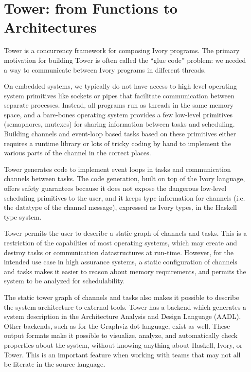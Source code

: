 \section{Tower: from Functions to Architectures}
\label{sec:tower}

Tower is a concurrency framework for composing Ivory programs. The primary
motivation for building Tower is often called the ``glue code'' problem: we
needed a way to communicate between Ivory programs in different threads.

On embedded systems, we typically do not have access to high level operating
system primitives like sockets or pipes that facilitate communication between
separate processes. Instead, all programs run as threads in the same memory
space, and a bare-bones operating system provides a few low-level primitives
(semaphores, mutexes) for sharing information between tasks and scheduling.
Building channels and event-loop based tasks based on these primitives either
requires a runtime library or lots of tricky coding by hand to implement the
various parts of the channel in the correct places.

Tower generates code to implement event loops in tasks and communication
channels between tasks. The code generation, built on top of the Ivory language,
offers safety guarantees because it does not expose the dangerous low-level
scheduling primitives to the user, and it keeps type information for channels
(i.e. the datatype of the channel message), expressed as Ivory types, in the
Haskell type system.

Tower permits the user to describe a static graph of channels and tasks. This is
a restriction of the capabilties of most operating systems, which may create and
destroy tasks or communication datastructures at run-time. However, for the
intended use case in high assurance systems, a static configuration of channels
and tasks makes it easier to reason about memory requirements, and permits
the system to be analyzed for schedulability.

The static tower graph of channels and tasks also makes it possible to
describe the system architecture to external tools. Tower has a backend which
generates a system description in the Architecture Analysis and Design Language
(AADL). Other backends, such as for the Graphviz dot language, exist as well.
These output formats make it possible to visualize, analyze, and automatically
check properties about the system, without knowing anything about Haskell,
Ivory, or Tower. This is an important feature when working with teams that may
not all be literate in the source language.

